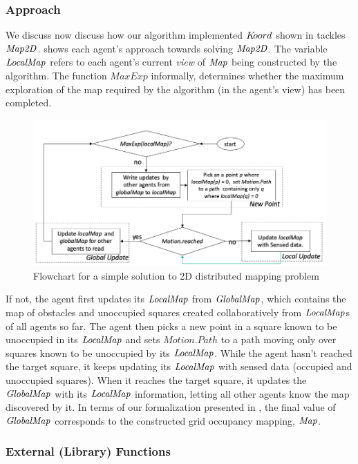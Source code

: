 \subsubsection{Approach}
We discuss now discuss how our algorithm implemented $K\kern-2pt oord$ shown in  tackles $\mathit{Map2D}$.  shows each agent's approach towards solving $\mathit{Map2D}$. The variable $\mathit{LocalMap}$ refers to each agent's current \emph{view} of $\mathit{Map}$ being constructed by the algorithm. The function $\mathit{MaxExp}$ informally, determines whether the maximum exploration of the map required by the algorithm (in the agent's view) has been completed. 
\begin{figure}[!htbp]
    \centering
    \includegraphics[width=\linewidth]{figs/map_flowchart.png}
    \caption{Flowchart for a simple solution to 2D distributed mapping problem\vspace{-1mm}}
    \label{fig:flowmap}
\end{figure}
If not, the agent first updates its $\mathit{LocalMap}$ from $\mathit{GlobalMap}$, which contains the map of obstacles and unoccupied squares created collaboratively from $\mathit{LocalMap}$s of all agents so far. The agent then picks a new point in a square known to be unoccupied in its $\mathit{LocalMap}$ and sets $\mathit{Motion.Path}$ to a path moving only over squares known to be unoccupied by its $\mathit{LocalMap}$. While the agent hasn't reached the target square, it keeps updating its $\mathit{LocalMap}$ with sensed data (occupied and unoccupied squares). When it reaches the target square, it updates the $\mathit{GlobalMap}$ with its $\mathit{LocalMap}$ information, letting all other agents know the map discovered by it. In terms of our formalization presented in , the final value of $\mathit{GlobalMap}$ corresponds to the constructed grid occupancy mapping, $\mathit{Map}$. 



\subsubsection{External (Library) Functions}
